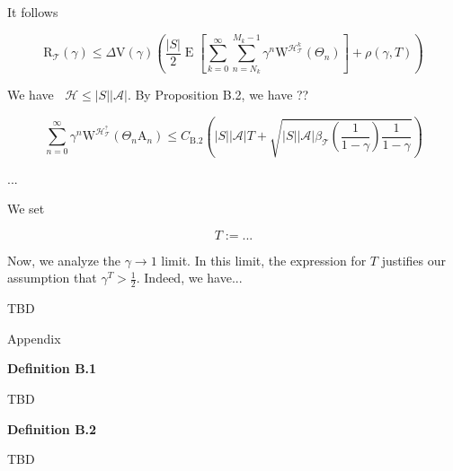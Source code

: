 \documentclass[a4paper]{article}
\newcommand{\Co}[1]{}
\newcommand{\AP}[1]{\left(#1\right)}
\newcommand{\AB}[1]{\left[#1\right]}
\newcommand{\Abs}[1]{\left\vert #1 \right\vert}
\newcommand{\E}[1]{\operatorname{E}\AB{#1}}
\newcommand{\A}{\mathcal{A}}
\newcommand{\T}{\mathcal{T}}
\newcommand{\Hy}{\mathcal{H}}
\DeclareMathOperator{\RVO}{\dim_{RVO}}
\newcommand{\V}{\mathrm{V}}
\newcommand{\Reg}{\mathrm{R}}
\newcommand{\AT}{\mathrm{A}}
\newcommand{\ET}{N}
\newcommand{\IT}{M}
\newcommand{\W}{\mathrm{W}}
\begin{document}
It follows

$$\Reg_\T(\gamma)\leq\Delta\V(\gamma)\AP{\frac{\Abs{S}}{2}\E{\sum_{k=0}^\infty\sum_{n=\ET_k}^{\IT_k-1}\gamma^{n}\W^{\Hy_\T^k}\AP{\Theta_n}}+\rho(\gamma,T)}$$

We have $\RVO\Hy\leq\Abs{S}\Abs{\A}$. By Proposition B.2, we have ??


$$\sum_{n=0}^\infty\gamma^{n}\W^{\Hy_\T^{?}}\AP{\Theta_{n}\AT_n}\leq C_{\text{B.2}}\AP{\Abs{S}\Abs{\A} T+\sqrt{\Abs{S}\Abs{\A}\beta_\T\AP{\frac{1}{1-\gamma}}\frac{1}{1-\gamma}}}$$

...

We set

$$T:=...$$

Now, we analyze the $\gamma\rightarrow1$ limit. In this limit, the expression for $T$ justifies our assumption that $\gamma^T>\frac{1}{2}$. Indeed, we have...

TBD

\begin{Huge}Appendix\end{Huge}

\textbf{Definition B.1}\Co{b}

TBD %

\textbf{Definition B.2}\Co{b}

TBD %
\end{document}
